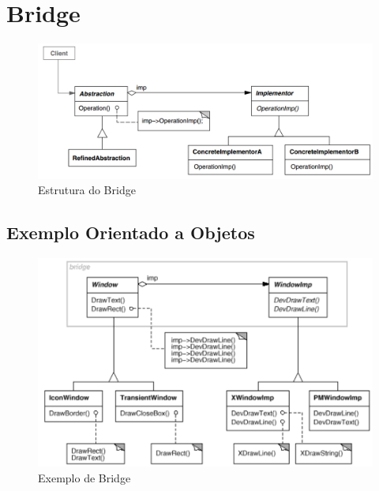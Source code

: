 \section{Bridge}

\begin{figure}[htb]
	\caption{\label{bridge_struct}Estrutura do Bridge}
	\begin{center}
	    \includegraphics[scale=0.4]{5_padroes-contexto-funcional/5.2_estruturais/5.2.2_bridge/diagram.png}
	\end{center}
\end{figure}

\subsection*{Exemplo Orientado a Objetos}

\begin{figure}[htb]
	\caption{\label{bridge_exemplo}Exemplo de Bridge}
	\begin{center}
	    \includegraphics[scale=0.45]{5_padroes-contexto-funcional/5.2_estruturais/5.2.2_bridge/exemplo_bridge.png}
	\end{center}
\end{figure}

